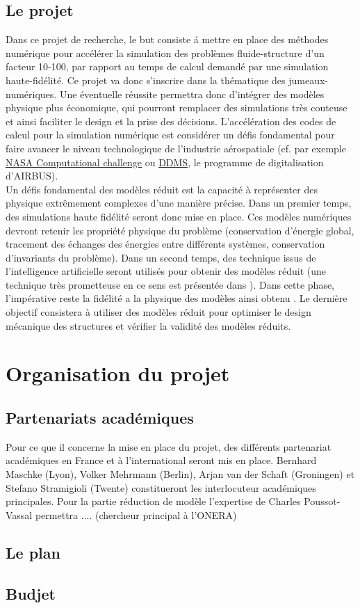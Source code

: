 \documentclass[french]{article}
\begin{document}
\subsection{Le projet}
Dans ce projet de recherche, le but consiste \'a mettre en place des méthodes numérique pour accélérer la simulation des problèmes fluide-structure d'un facteur 10-100, par rapport au temps de calcul demandé par une simulation haute-fidélité. Ce projet va donc s'inscrire dans la thématique des jumeaux-numériques. Une éventuelle réussite permettra donc d'intégrer des modèles physique plus économique, qui pourront remplacer des simulations très couteuse et ainsi faciliter le design et la prise des décisions. L'accélération des codes de calcul pour la simulation numérique est considérer un défis fondamental pour faire avancer le niveau technologique de l'industrie aérospatiale (cf. par exemple  \href{https://www.nasa.gov/aero/nasa-issues-a-challenge-to-speed-up-its-supercomputer-code}{NASA Computational challenge} ou \href{https://www.airbus.com/innovation/industry-4-0/digital-design-and-manufacturing-ddms.html}{DDMS}, le programme de digitalisation d'AIRBUS).  \\

Un défis fondamental des modèles réduit est la capacité \`a représenter des physique extrêmement complexes d'une manière précise. 
Dans un premier temps, des simulations haute fidélité seront donc mise en place. Ces modèles numériques devront retenir les propriété physique du problème (conservation d'énergie global, tracement des échanges des énergies entre différents systèmes, conservation d'invariants du problème). Dans un second temps, des technique issus de l'intelligence artificielle seront utilisés pour obtenir des modèles réduit (une technique très prometteuse en ce sens est présentée dans \cite{lee2020}). Dans cette phase, l'impérative reste la fidélité a la physique des modèles ainsi obtenu \cite{willcox2021}. Le dernière objectif consistera \`a utiliser des modèles réduit pour optimiser le design mécanique des structures et vérifier la validité des modèles réduits. 

\section{Organisation du projet}

\subsection{Partenariats académiques}
Pour ce que il concerne la mise en place du projet, des différents partenariat académiques en France et \`a l'international  seront mis en place. Bernhard Maschke (Lyon), Volker Mehrmann (Berlin), Arjan van der Schaft (Groningen) et Stefano Stramigioli (Twente) constitueront les interlocuteur académiques principales. Pour la partie réduction de modèle l'expertise de Charles Poussot-Vassal permettra .... (chercheur principal \`a l'ONERA)

\subsection{Le plan}

\subsection{Budjet}



\footnotesize


\end{document}
